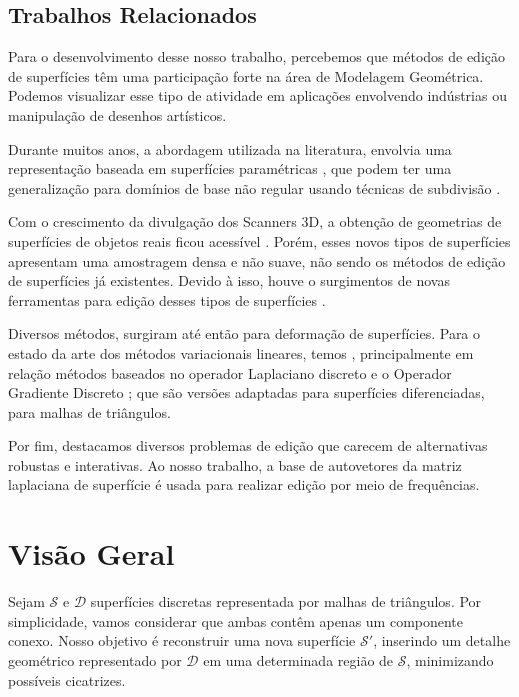 \subsection{Trabalhos Relacionados}

Para o desenvolvimento desse nosso trabalho, percebemos que métodos de edição de superfícies têm uma participação forte na área de Modelagem Geométrica. Podemos visualizar esse tipo de atividade em aplicações envolvendo indústrias ou manipulação de desenhos artísticos.

Durante muitos anos, a abordagem utilizada na literatura, envolvia uma representação baseada em superfícies paramétricas \cite{FarinG}, que podem ter uma generalização para domínios de base não regular usando técnicas de subdivisão \cite{SCHRZORI}.

Com o crescimento da divulgação dos Scanners 3D, a obtenção de geometrias de superfícies de objetos reais ficou acessível \cite{NEUGEBAUER}. Porém, esses novos tipos de superfícies apresentam uma amostragem densa e não suave, não sendo os métodos de edição de superfícies já existentes. Devido à isso, houve o surgimentos de novas ferramentas para edição desses tipos de superfícies .

Diversos métodos, surgiram até então para deformação de superfícies. Para o estado da arte dos métodos variacionais lineares, temos  \cite{Olga}, principalmente em relação métodos baseados no operador Laplaciano discreto \cite{Lang} e o Operador Gradiente Discreto \cite{Yu:2004}; que são versões adaptadas para superfícies diferenciadas, para malhas de triângulos.

Por fim, destacamos diversos problemas de edição que carecem de alternativas robustas e interativas. Ao nosso trabalho, a base de autovetores da matriz laplaciana de superfície é usada para realizar edição por meio de frequências.

\section{Visão Geral}

Sejam $\mathcal{S}$ e $\mathcal{D}$ superfícies discretas representada por malhas de triângulos. Por simplicidade, vamos considerar que ambas contêm apenas um componente conexo. Nosso objetivo é reconstruir uma nova superfície $\mathcal{S}'$, inserindo um detalhe geométrico representado por $\mathcal{D}$ em uma determinada região de $\mathcal{S}$, minimizando possíveis cicatrizes. 

